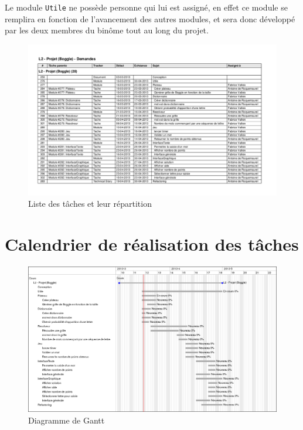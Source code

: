 \documentclass[12pt,a4paper,openany]{article}
\begin{document}
	Le module \texttt{Utile} ne possède personne qui lui est assigné, en effet ce module se remplira en fonction de l'avancement des autres modules, et sera donc
	développé par les deux membres du binôme tout au long du projet.
	\begin{figure}[H]
		\centering
		\includegraphics[angle=-90,width=15.2cm]{taches.pdf}
		\caption{Liste des tâches et leur répartition}
	\end{figure}
	\section{Calendrier de réalisation des tâches}
	\begin{figure}[H]
		\centering
		\includegraphics[angle=-90,width=14.2cm]{gantt.png}
		\caption{Diagramme de Gantt}
	\end{figure}
\end{document}
